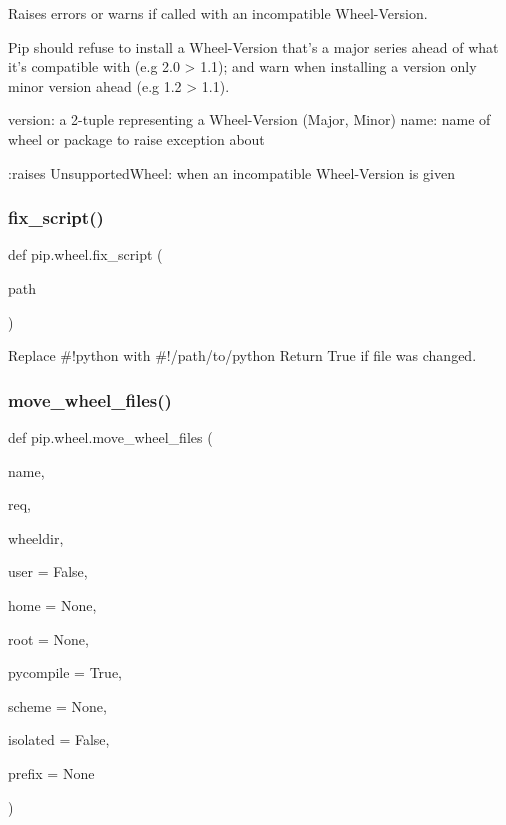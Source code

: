 \begin{DoxyVerb}Raises errors or warns if called with an incompatible Wheel-Version.

Pip should refuse to install a Wheel-Version that's a major series
ahead of what it's compatible with (e.g 2.0 > 1.1); and warn when
installing a version only minor version ahead (e.g 1.2 > 1.1).

version: a 2-tuple representing a Wheel-Version (Major, Minor)
name: name of wheel or package to raise exception about

:raises UnsupportedWheel: when an incompatible Wheel-Version is given
\end{DoxyVerb}
 \mbox{\label{namespacepip_1_1wheel_a599a39423d9d0b31026681b5715446b8}} 
\subsubsection{\texorpdfstring{fix\+\_\+script()}{fix\_script()}}
{\footnotesize\ttfamily def pip.\+wheel.\+fix\+\_\+script (\begin{DoxyParamCaption}\item[{}]{path }\end{DoxyParamCaption})}

\begin{DoxyVerb}Replace #!python with #!/path/to/python
Return True if file was changed.\end{DoxyVerb}
 \mbox{\label{namespacepip_1_1wheel_a922fc81dd2fead488599fcb9aa3bd810}} 
\subsubsection{\texorpdfstring{move\+\_\+wheel\+\_\+files()}{move\_wheel\_files()}}
{\footnotesize\ttfamily def pip.\+wheel.\+move\+\_\+wheel\+\_\+files (\begin{DoxyParamCaption}\item[{}]{name,  }\item[{}]{req,  }\item[{}]{wheeldir,  }\item[{}]{user = {\ttfamily False},  }\item[{}]{home = {\ttfamily None},  }\item[{}]{root = {\ttfamily None},  }\item[{}]{pycompile = {\ttfamily True},  }\item[{}]{scheme = {\ttfamily None},  }\item[{}]{isolated = {\ttfamily False},  }\item[{}]{prefix = {\ttfamily None} }\end{DoxyParamCaption})}

